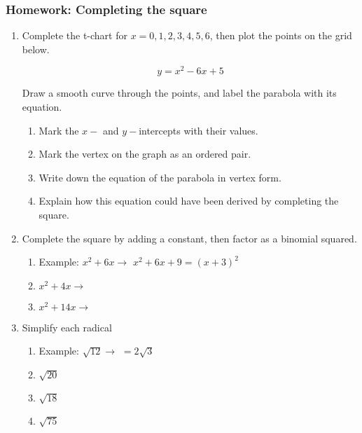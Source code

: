 \documentclass[12pt, twoside]{article}
\begin{document}
\subsubsection*{Homework: Completing the square}
  \begin{enumerate}

    \item Complete the t-chart for $x=0,1,2,3,4,5,6$, then plot the points on the grid below.

        \[y = x^2-6x+5\]

        Draw a smooth curve through the points, and label the parabola with its equation.
      \begin{center} %
      \end{center}

    \begin{enumerate}
      \item Mark the $x-$ and $y-$intercepts with their values.
      \item Mark the vertex on the graph as an ordered pair.
      \item Write down the equation of the parabola in vertex form. \vspace{1.5cm}
      \item Explain how this equation could have been derived by completing the square.
    \end{enumerate}



\newpage

  \item Complete the square by adding a constant, then factor as a binomial squared.
    \begin{enumerate}
      \item Example: $x^2+6x \rightarrow$ \qquad $x^2+6x+9=(x+3)^2$
      \item $x^2+4x \rightarrow$
      \item $x^2+14x \rightarrow$
    \end{enumerate}

  \item Simplify each radical
    \begin{enumerate}
      \item Example: $\sqrt{12} \rightarrow$ \qquad $=2\sqrt{3}$
      \item $\sqrt{20}$
      \item $\sqrt{18}$
      \item $\sqrt{75}$
    \end{enumerate}



\end{enumerate}
\end{document}

